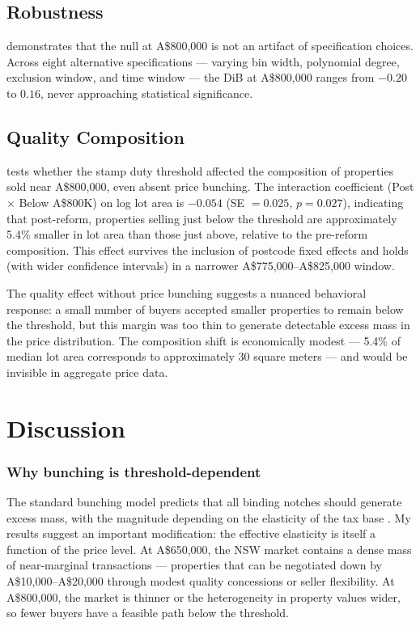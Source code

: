 \documentclass[12pt]{article}
\begin{document}
\subsection{Robustness}

 demonstrates that the null at A\$800,000 is not an artifact of specification choices. Across eight alternative specifications --- varying bin width, polynomial degree, exclusion window, and time window --- the DiB at A\$800,000 ranges from $-0.20$ to $0.16$, never approaching statistical significance.



\subsection{Quality Composition}

 tests whether the stamp duty threshold affected the composition of properties sold near A\$800,000, even absent price bunching. The interaction coefficient (Post $\times$ Below A\$800K) on log lot area is $-0.054$ (SE $= 0.025$, $p = 0.027$), indicating that post-reform, properties selling just below the threshold are approximately 5.4\% smaller in lot area than those just above, relative to the pre-reform composition. This effect survives the inclusion of postcode fixed effects and holds (with wider confidence intervals) in a narrower A\$775,000--A\$825,000 window.



The quality effect without price bunching suggests a nuanced behavioral response: a small number of buyers accepted smaller properties to remain below the threshold, but this margin was too thin to generate detectable excess mass in the price distribution. The composition shift is economically modest --- 5.4\% of median lot area corresponds to approximately 30 square meters --- and would be invisible in aggregate price data.

\section{Discussion}
\label{sec:discussion}

\subsubsection*{Why bunching is threshold-dependent} The standard bunching model predicts that all binding notches should generate excess mass, with the magnitude depending on the elasticity of the tax base \citep{kleven2016}. My results suggest an important modification: the effective elasticity is itself a function of the price level. At A\$650,000, the NSW market contains a dense mass of near-marginal transactions --- properties that can be negotiated down by A\$10,000--A\$20,000 through modest quality concessions or seller flexibility. At A\$800,000, the market is thinner or the heterogeneity in property values wider, so fewer buyers have a feasible path below the threshold.
\end{document}
